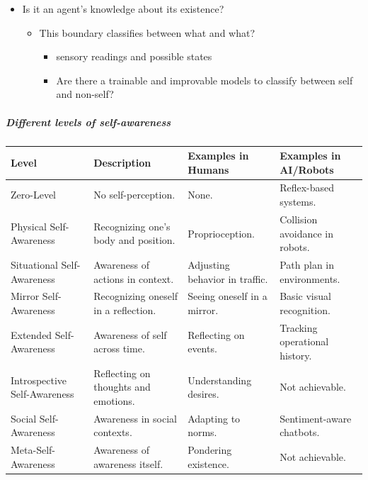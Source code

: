 \documentclass{book}
\begin{document}
\begin{itemize}
    \item Is it an agent's knowledge about its existence?

    \begin{itemize}
        \item This boundary classifies between what and what?
        \begin{itemize}
            \item sensory readings and possible states
            \item Are there a trainable and improvable models to classify between self and non-self?
        \end{itemize}
    \end{itemize}
\end{itemize}

\subparagraph{Different levels of self-awareness}
\begin{tabular}{|l|l|l|l|}
    \hline
    \textbf{Level}               & \textbf{Description}                 & \textbf{Examples in Humans}    & \textbf{Examples in AI/Robots} \\ \hline
    Zero-Level                   & No self-perception.                  & None.                          & Reflex-based systems.          \\ \hline
    Physical Self-Awareness      & Recognizing one’s body and position. & Proprioception.                & Collision avoidance in robots. \\ \hline
    Situational Self-Awareness   & Awareness of actions in context.     & Adjusting behavior in traffic. & Path plan in environments. \\ \hline
    Mirror Self-Awareness        & Recognizing oneself in a reflection. & Seeing oneself in a mirror. & Basic visual recognition. \\ \hline
    Extended Self-Awareness      & Awareness of self across time.       & Reflecting on events.          & Tracking operational history.  \\ \hline
    Introspective Self-Awareness & Reflecting on thoughts and emotions. & Understanding desires. & Not achievable. \\ \hline
    Social Self-Awareness        & Awareness in social contexts.        & Adapting to norms.             & Sentiment-aware chatbots.      \\ \hline
    Meta-Self-Awareness          & Awareness of awareness itself.       & Pondering existence.           & Not achievable.                \\ \hline
\end{tabular}
\end{document}
